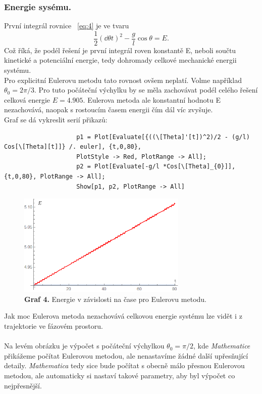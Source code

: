 \documentclass[reqno, a4paper]{amsart}
\begin{document}
				\subsubsection{Energie sysému.} První integrál rovnice ~\eqref{eq:4} je ve tvaru
				\begin{equation}
					\frac{1}{2}
					\left(
					\dd{\theta}{t}
					\right)^2
					-
					\frac{g}{l}
					\cos \theta
					=
					E
					.
				\end{equation}
				Což říká, že podél řešení je první integrál roven konstantě E, neboli součtu kinetické a potenciální energie, tedy dohromady celkové mechanické energii systému.
				\\
				Pro explicitní Eulerovu metodu tato rovnost ovšem neplatí. Volme například $\theta_{0} =2\pi/3$. Pro tuto počáteční výchylku by se měla zachovávat podél celého řešení celková energie $E=4.905$. Eulerova metoda ale konstantní hodnotu E nezachovává, naopak s rostoucím časem energii čím dál víc zvyšuje.
				\\
				Graf se dá vykreslit serií přikazů:
				\begin{verbatim}
					p1 = Plot[Evaluate[{((\[Theta]'[t])^2)/2 - (g/l) Cos[\[Theta][t]]} /. euler], {t,0,80}, 
					PlotStyle -> Red, PlotRange -> All];
					p2 = Plot[Evaluate[-g/l *Cos[\[Theta]_{0}]], {t,0,80}, PlotRange -> All];
					Show[p1, p2, PlotRange -> All]
				\end{verbatim}
				\begin{figure}[h]
					\centering
					\includegraphics[width=0.72\textwidth]{energie}
					\caption*{\textbf{Graf 4.} Energie v závislosti na čase pro Eulerovu metodu.}  
				\end{figure}
				Jak moc Eulerova metoda nezachovává celkovou energie systému lze vidět i z trajektorie ve fázovém prostoru.\
				\\
				\\
				Na levém obrázku je výpočet s počáteční výchylkou $\theta_{0}=\pi/2$, kde \textit{Mathematice} přikážeme počítat Eulerovou metodou, ale nenastavíme žádné další upřesňující detaily. \textit{Mathematica} tedy sice bude počítat s obecně málo přesnou Eulerovou metodou, ale automaticky si nastaví takové parametry, aby byl výpočet co nejpřesnější.
\end{document}
